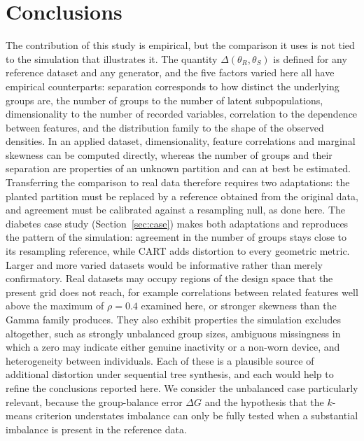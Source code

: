 \documentclass[pdflatex,referee]{sn-jnl}
\begin{document}
\section{Conclusions}

The contribution of this study is empirical, but the comparison it uses is not
tied to the simulation that illustrates it.
The quantity $\Delta(\theta_R, \theta_S)$ is defined for any reference dataset
and any generator, and the five factors varied here all have empirical
counterparts: separation corresponds to how distinct the underlying groups
are, the number of groups to the number of latent subpopulations,
dimensionality to the number of recorded variables, correlation to the
dependence between features, and the distribution family to the shape of the
observed densities.
In an applied dataset, dimensionality, feature correlations and marginal
skewness can be computed directly, whereas the number of groups and their
separation are properties of an unknown partition and can at best be
estimated.
Transferring the comparison to real data therefore requires two adaptations:
the planted partition must be replaced by a reference obtained from the
original data, and agreement must be calibrated against a resampling null, as
done here.
The diabetes case study (Section~\ref{sec:case}) makes both adaptations and
reproduces the pattern of the simulation: agreement in the number of groups
stays close to its resampling reference, while CART adds distortion to every
geometric metric. Larger and more varied datasets would be informative rather
than merely confirmatory.
Real datasets may occupy regions of the design space that the present grid
does not reach, for example correlations between related features well above
the maximum of $\rho = 0.4$ examined here, or stronger skewness than the Gamma
family produces.
They also exhibit properties the simulation excludes altogether, such
as strongly unbalanced group sizes, ambiguous missingness in which a zero may
indicate either genuine inactivity or a non-worn device, and heterogeneity
between individuals. Each of these is a plausible source of additional
distortion under sequential tree synthesis, and each would help to refine the
conclusions reported here. We consider the unbalanced case particularly
relevant, because the group-balance error $\Delta G$ and the hypothesis that
the $k$-means criterion understates imbalance can only be fully tested when a
substantial imbalance is present in the reference data.
\end{document}
